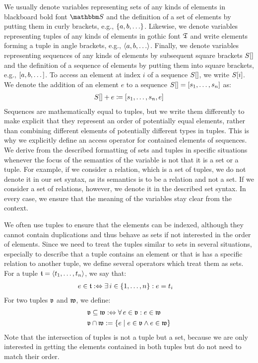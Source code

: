 We usually denote variables representing sets of any kinds of elements in blackboard bold font $\set{S}{}$ and the definition of a set of elements by putting them in curly brackets, e.g., $\setted{a, b, \dots}$.
Likewise, we denote variables representing tuples of any kinds of elements in gothic font $\mathfrak{T}{}$ and write elements forming a tuple in angle brackets, e.g., $\tupled{a, b, \dots}$.
Finally, we denote variables representing sequences of any kinds of elements by subsequent square brackets $S[]$ and the definition of a sequence of elements by putting them into square brackets, e.g., $[a, b, \dots]$.
To access an element at index $i$ of a sequence $S[]$, we write $S[i]$.
We denote the addition of an element $e$ to a sequence $S[] = [s_1, \dots, s_n]$ as:
\begin{align*}
    S[] + e \coloneqq [s_1, \dots, s_n, e]
\end{align*}
Sequences are mathematically equal to tuples, but we write them differently to make explicit that they represent an order of potentially equal elements, rather than combining different elements of potentially different types in tuples. This is why we explicitly define an access operator for contained elements of sequences.
We derive from the described formatting of sets and tuples in specific situations whenever the focus of the semantics of the variable is not that it is a set or a tuple.
For example, if we consider a relation, which is a set of tuples, we do not denote it in our set syntax, as its semantics is to be a relation and not a set.
If we consider a set of relations, however, we denote it in the described set syntax.
In every case, we ensure that the meaning of the variables stay clear from the context.

We often use tuples to ensure that the elements can be indexed, although they cannot contain duplications and thus behave as sets if not interested in the order of elements.
Since we need to treat the tuples similar to sets in several situations, especially to describe that a tuple contains an element or that is has a specific relation to another tuple, we define several operators which treat them as sets.
For a tuple $\mathfrak{t} = \langle t_1, \dots, t_n \rangle$, we say that:
\begin{align*}
    &
    e \in \tuple{t}{} \equivalentperdefinition \exists i \in \setted{1, \dots, n} : e = t_i
\end{align*}
For two tuples $\mathfrak{v}$ and $\mathfrak{w}$, we define:
\begin{align*}
    &
    \tuple{v} \subseteq \tuple{w} \equivalentperdefinition \forall e \in \tuple{v} : e \in \tuple{w} \\
    &
    \tuple{v} \cap \tuple{w} := \setted{e \mid e \in \tuple{v} \land e \in \tuple{w}}
\end{align*}
Note that the intersection of tuples is not a tuple but a set, because we are only interested in getting the elements contained in both tuples but do not need to match their order.


